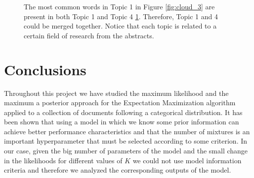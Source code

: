 \documentclass[12pt]{article}
\begin{document}
\begin{figure}[h]
\begin{subfigure}{0.4\textwidth}
		\caption{}
		\label{fig:cloud_4}
	\end{subfigure}
	\caption{The most common words in Topic 1 in Figure \ref{fig:cloud_3} are present in both Topic 1 and Topic 4 \ref{fig:cloud_4}. Therefore, Topic 1 and 4 could be merged together. Notice that each topic is related to a certain field of research from the abstracts.}
	\label{fig:clouds}
\end{figure}


\section{Conclusions}

Throughout this project we have studied the maximum likelihood and the maximum a posterior approach for the Expectation Maximization algorithm applied to a collection of documents following a categorical distribution. It has been shown that using a model in which we know some prior information can achieve better performance characteristics and that the number of mixtures is an important hyperparameter that must be selected according to some criterion. In our case, given the big number of parameters of the model and the small change in the likelihoods for different values of $K$ we  could not use model information criteria and therefore we analyzed the corresponding outputs of the model.

\clearpage
\nocite{*}
\printbibliography
\end{document}
